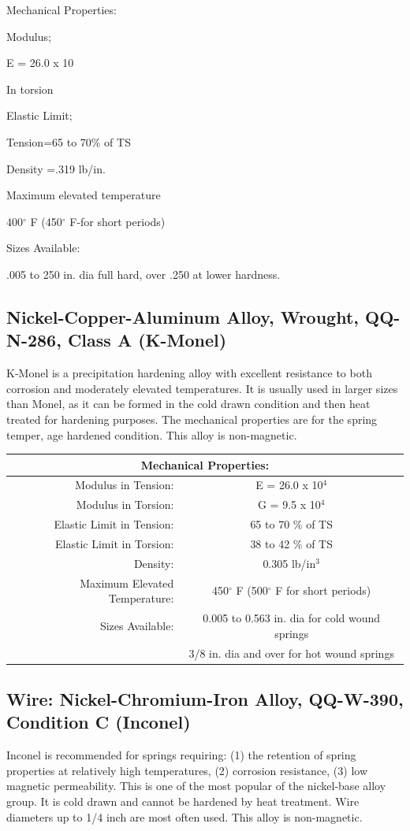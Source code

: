 \documentclass[10pt]{article}
\begin{document}
Mechanical Properties:

Modulus;


E = 26.0 x 10

In torsion


Elastic Limit;

Tension=65 to 70\% of TS


Density =.319 lb/in.

Maximum elevated temperature

400$^\circ$ F (450$^\circ$ F-for short periods)

Sizes Available:

.005 to 250 in. dia full hard, over .250 at lower hardness.


\subsection{Nickel-Copper-Aluminum Alloy, Wrought, QQ-N-286, Class A (K-Monel)} %
K-Monel is a precipitation hardening alloy with excellent resistance to both corrosion and moderately elevated temperatures. 
It is usually used in larger sizes than Monel, as it can be formed in the cold drawn condition and then heat treated for hardening purposes. 
The mechanical properties are for the spring temper, age hardened condition. 
This alloy is non-magnetic.
\begin{center}
\begin{tabular}{ r c }
\multicolumn{2}{c}{Mechanical Properties:} \\
\hline
Modulus in Tension: & E = 26.0 x 10$^4$ \\  
Modulus in Torsion: & G = 9.5 x 10$^4$ \\
Elastic Limit in Tension: & 65 to 70 \% of TS \\  
Elastic Limit in Torsion: & 38 to 42 \% of TS \\

Density: & 0.305 lb/in$^3$ \\
Maximum Elevated Temperature: & 450$^\circ$ F (500$^\circ$ F for short periods) \\
Sizes Available: & 0.005 to 0.563 in. dia for cold wound springs \\
& 3/8 in. dia and over for hot wound springs \\
\hline
\end{tabular}
\end{center}

\subsection{Wire: Nickel-Chromium-Iron Alloy, QQ-W-390, Condition C (Inconel)} %
Inconel is recommended for springs requiring: 
(1) the retention of spring properties at relatively high temperatures, 
(2) corrosion resistance, 
(3) low magnetic permeability. 
This is one of the most popular of the nickel-base alloy group. 
It is cold drawn and cannot be hardened by heat treatment. 
Wire diameters up to 1/4 inch are most often used. 
This alloy is non-magnetic.
\end{document}
